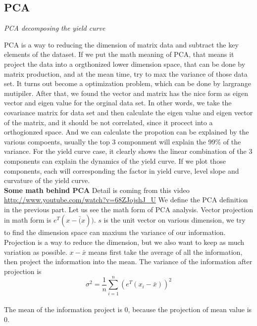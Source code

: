 \documentclass[a4paper,11pt]{article}
\begin{document}
\subsection{PCA}
\begin{centering}
\em {PCA decomposing the yield curve\\}
\end{centering}
PCA is a way to reducing the dimension of matrix data and subtract the key elements of the dataset. If we put the math meaning of PCA, that means it project the data into a orgthonized lower dimension space, that can be done by matrix production, and at the mean time, try to max the variance of those data set. It turns out become a optimization problem, which can be done by largrange mutipiler. After that, we found the vector and matrix has the nice form as eigen vector and eigen value for the orginal data set. In other words, we take the covariance matrix for data set and then calculate the eigen value and eigen vector of the matrix, and it should be not correlated, since it procect into a orthogionzed space. And we can calculate the propotion can be explained by the various compoents, usually the top 3 componment will explain the 99\%  of the variance. For the yield curve case, it clearly shows the linear combination of the 3 components can explain the dynamics of the yield curve.    If we plot those components, each will corresponding the factor in yield curve, level slope and curvature of the yield curve.\\
{\bf Some math behind PCA}
Detail is coming from this video \url{http://www.youtube.com/watch?v=68ZJojshJ_U}
We define the PCA definition in the previous part. Let us see the math form of PCA analysis. Vector projection in math form is $e^T(x-\bar(x))$. $s$ is the unit vector on various dimension, we try to find the dimension space can maxium the variance of our information. Projection is a way to reduce the dimension, but we also want to keep as much variation as possible. $x-\bar x $ means first take the average of all the information, then project the information into the mean. The variance of the information after projection is
 $$\sigma^2=\frac{1}{n}\sum\limits_{i=1}^n (e^T(x_i-\bar x))^2$$ \\
 The mean of the information project is 0, because the projection of mean value is 0.
\end{document}
